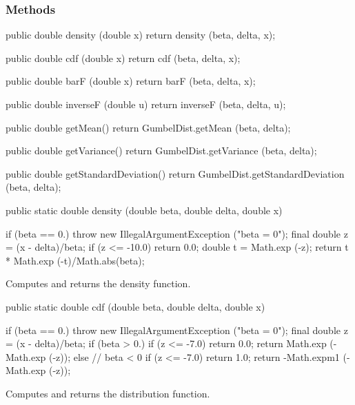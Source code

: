 \subsubsection* {Methods}
\begin{code}\begin{hide}

   public double density (double x) {
      return density (beta, delta, x);
   }

   public double cdf (double x) {
      return cdf (beta, delta, x);
   }

   public double barF (double x) {
      return barF (beta, delta, x);
   }

   public double inverseF (double u) {
      return inverseF (beta, delta, u);
   }

   public double getMean() {
      return GumbelDist.getMean (beta, delta);
   }

   public double getVariance() {
      return GumbelDist.getVariance (beta, delta);
   }

   public double getStandardDeviation() {
      return GumbelDist.getStandardDeviation (beta, delta);
   }\end{hide}

   public static double density (double beta, double delta, double x)\begin{hide} {
      if (beta == 0.)
         throw new IllegalArgumentException ("beta = 0");
      final double z = (x - delta)/beta;
      if (z <= -10.0)
         return 0.0;
      double t = Math.exp (-z);
      return  t * Math.exp (-t)/Math.abs(beta);
   }\end{hide}
\end{code}
\begin{tabb} Computes and returns the density function.
\end{tabb}
\begin{code}

   public static double cdf (double beta, double delta, double x)\begin{hide} {
      if (beta == 0.)
         throw new IllegalArgumentException ("beta = 0");
      final double z = (x - delta)/beta;
      if (beta > 0.) {
         if (z <= -7.0)
            return 0.0;
         return Math.exp (-Math.exp (-z));
      } else {   // beta < 0
          if (z <= -7.0)
            return 1.0;
         return -Math.expm1 (-Math.exp (-z));
     }
   }\end{hide}
\end{code}
 \begin{tabb}
  Computes and returns  the distribution function.
 \end{tabb}
